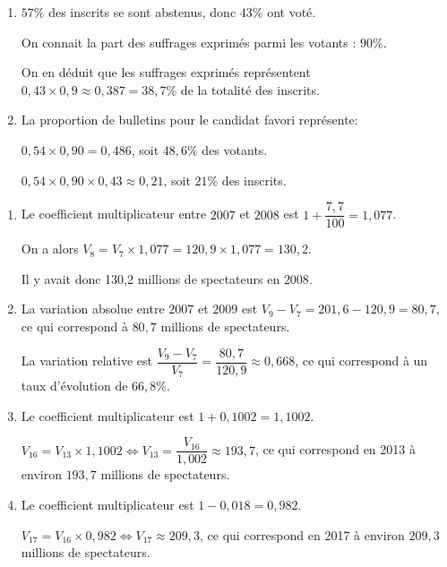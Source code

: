 \documentclass[a4paper]{article}
\begin{document}
    \medskip

    \begin{exercice}{}{}
    \begin{enumerate}
      \item $57\%$ des inscrits se sont abstenus, donc $43\%$ ont voté.

      On connait la part des suffrages exprimés parmi les votants : $90\%$.

      On en déduit que les suffrages exprimés représentent $0,43\times 0,9\approx 0,387=38,7\%$ de la totalité des inscrits.

      \item La proportion de bulletins pour le candidat favori représente:
      
      $0,54\times0,90=0,486$, soit $48,6\%$ des votants.

      $0,54\times0,90\times 0,43\approx 0,21$, soit $21\%$ des inscrits.


    \end{enumerate}
    \end{exercice}


    \medskip 

    \begin{exercice}{}{}
      \begin{enumerate}
        \item  Le coefficient multiplicateur entre $2007$ et $2008$ est $1+\dfrac{7,7}{100}=1,077$.
        
        On a alors $V_8=V_7\times 1,077=120,9\times 1,077=130,2$.

        Il y avait donc 130,2 millions de spectateurs en $2008$.

        \item La variation absolue entre $2007$ et $2009$ est $V_9-V_7=201,6-120,9=80,7$, ce qui correspond à $80,7$ millions de spectateurs.
        
        La variation relative est $\dfrac{V_9-V_7}{V_7}=\dfrac{80,7}{120,9}\approx 0,668$, ce qui correspond à un taux d'évolution de $66,8\%$.

        \item Le coefficient multiplicateur est $1+0,1002=1,1002$.

        $V_{16}=V_{13} \times 1,1002 \iff V_{13}=\dfrac{V_{16}}{1,002}\approx 193,7$, ce qui correspond en 2013 à environ $193,7$ millions de spectateurs.

        \item  Le coefficient multiplicateur est $1-0,018=0,982$.

        $V_{17}=V_{16} \times 0,982 \iff V_{17}\approx 209,3$, ce qui correspond en 2017 à environ $209,3$ millions de spectateurs.


      \end{enumerate}
    \end{exercice}
\end{document}

